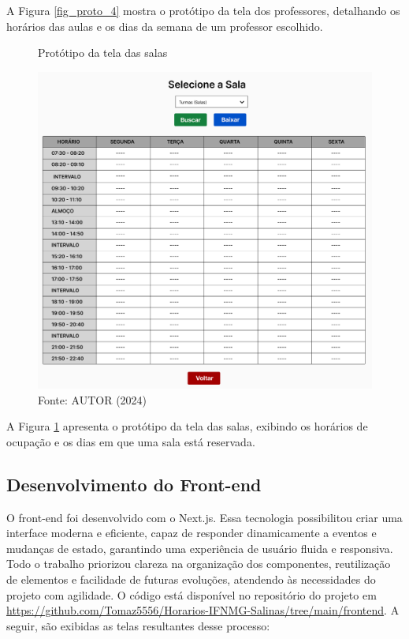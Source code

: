 A Figura \ref{fig_proto_4} mostra o protótipo da tela dos professores, detalhando os horários das aulas e os dias da semana de um professor escolhido.

\begin{figure}[H]
    \centering
    \caption{Protótipo da tela das salas}
    \includegraphics[width=1\textwidth]{Figuras/proto-5.PNG}
    \caption*{Fonte: AUTOR (2024)}
    \label{fig_proto_5}
\end{figure}

A Figura \ref{fig_proto_5} apresenta o protótipo da tela das salas, exibindo os horários de ocupação e os dias em que uma sala está reservada.

\subsection{Desenvolvimento do Front-end}

O front-end foi desenvolvido com o Next.js. Essa tecnologia possibilitou criar uma interface moderna e eficiente, capaz de responder dinamicamente a eventos e mudanças de estado, garantindo uma experiência de usuário fluida e responsiva. Todo o trabalho priorizou clareza na organização dos componentes, reutilização de elementos e facilidade de futuras evoluções, atendendo às necessidades do projeto com agilidade. O código está disponível no repositório do projeto em \url{https://github.com/Tomaz5556/Horarios-IFNMG-Salinas/tree/main/frontend}. A seguir, são exibidas as telas resultantes desse processo:

